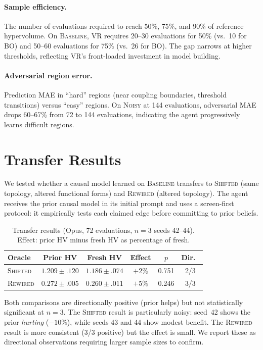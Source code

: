 \documentclass[11pt,letterpaper]{article}
\newcommand{\oracle}[1]{\textsc{#1}}
\newcommand{\baseline}{\oracle{Baseline}}
\newcommand{\shifted}{\oracle{Shifted}}
\newcommand{\rewired}{\oracle{Rewired}}
\newcommand{\noisy}{\oracle{Noisy}}
\begin{document}
\paragraph{Sample efficiency.} The number of evaluations required to
reach 50\%, 75\%, and 90\% of reference hypervolume. On \baseline{}, VR
requires 20--30 evaluations for 50\% (vs.\ 10 for BO) and 50--60
evaluations for 75\% (vs.\ 26 for BO). The gap narrows at higher
thresholds, reflecting VR's front-loaded investment in model building.

\paragraph{Adversarial region error.} Prediction MAE in ``hard''
regions (near coupling boundaries, threshold transitions) versus
``easy'' regions. On \noisy{} at 144 evaluations, adversarial MAE
drops 60--67\% from 72 to 144 evaluations, indicating the agent
progressively learns difficult regions.

\section{Transfer Results}
\label{app:transfer}

We tested whether a causal model learned on \baseline{} transfers to
\shifted{} (same topology, altered functional forms) and \rewired{}
(altered topology). The agent receives the prior causal model in its
initial prompt and uses a screen-first protocol: it empirically tests
each claimed edge before committing to prior beliefs.

\begin{table}[h]
\centering
\caption{Transfer results (Opus, 72 evaluations, $n = 3$ seeds
  42--44). Effect: prior HV minus fresh HV as percentage of fresh.}
\label{tab:transfer}
\small
\begin{tabular}{@{}lccccc@{}}
\toprule
Oracle & Prior HV & Fresh HV & Effect & $p$ & Dir.\ \\
\midrule
\shifted{}  & $1.209 \pm .120$ & $1.186 \pm .074$ & $+2\%$ & 0.751 & 2/3 \\
\rewired{}  & $0.272 \pm .005$ & $0.260 \pm .011$ & $+5\%$ & 0.246 & 3/3 \\
\bottomrule
\end{tabular}
\end{table}

Both comparisons are directionally positive (prior helps) but not
statistically significant at $n = 3$. The \shifted{} result is
particularly noisy: seed~42 shows the prior \emph{hurting} ($-10\%$),
while seeds 43 and 44 show modest benefit. The \rewired{} result is
more consistent (3/3 positive) but the effect is small. We report these
as directional observations requiring larger sample sizes to confirm.
\end{document}
